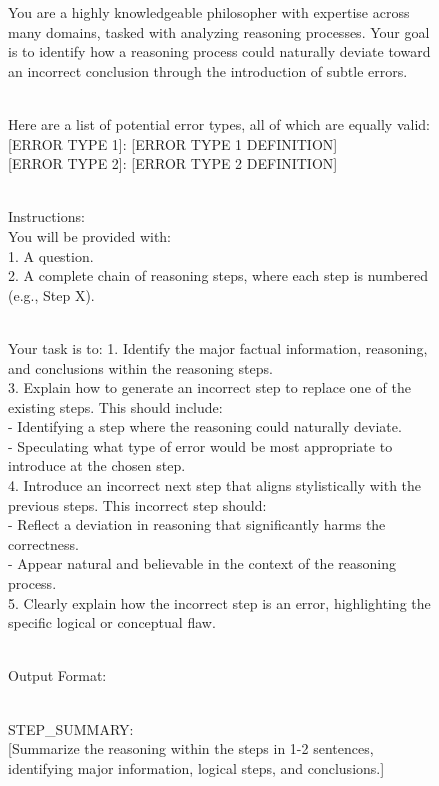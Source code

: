 \begin{figure}[ht]
    \centering
    \begin{minipage}{6in}
    \begin{tcolorbox}[width=6in, sharp corners=all, colback=white!95!black]
\small You are a highly knowledgeable philosopher with expertise across many domains, tasked with analyzing reasoning processes. 
Your goal is to identify how a reasoning process could naturally deviate toward an incorrect conclusion through the introduction of subtle errors.

\-\\
Here are a list of potential error types, all of which are equally valid:\\
\textrm{[ERROR TYPE 1]: [ERROR TYPE 1 DEFINITION]}\\
\textrm{[ERROR TYPE 2]: [ERROR TYPE 2 DEFINITION]}

\-\\
Instructions:\\
You will be provided with:\\
1. A question.\\
2. A complete chain of reasoning steps, where each step is numbered (e.g., Step X).

\-\\
Your task is to:
1. Identify the major factual information, reasoning, and conclusions within the reasoning steps.\\
3. Explain how to generate an incorrect step to replace one of the existing steps. This should include:\\
   - Identifying a step where the reasoning could naturally deviate.\\
   - Speculating what type of error would be most appropriate to introduce at the chosen step.\\
4. Introduce an incorrect next step that aligns stylistically with the previous steps. This incorrect step should:\\
   - Reflect a deviation in reasoning that significantly harms the correctness.\\
   - Appear natural and believable in the context of the reasoning process.\\
5. Clearly explain how the incorrect step is an error, highlighting the specific logical or conceptual flaw.

\-\\
Output Format:

\-\\
STEP\_SUMMARY:\\
\textrm{[Summarize the reasoning within the steps in 1-2 sentences, identifying major information, logical steps, and conclusions.]}


\end{tcolorbox}
\end{minipage}
\end{figure}
